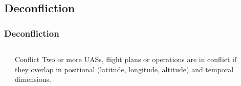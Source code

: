 \documentclass[usenames,dvipsnames,aspectratio=169,serif]{beamer}
\begin{document}
\subsection{Deconfliction}

\begin{frame}
   \frametitle{Deconfliction}
   \begin{columns}[t]
      \begin{column}{0.25\textwidth}
      \end{column}
      \begin{column}{0.5\textwidth}
         \begin{block}{Conflict}
            Two or more UASs, flight plans or operations are in conflict if they overlap in positional (latitude, longitude, altitude) and temporal dimensions.
         \end{block}
      \end{column}
      \begin{column}{0.25\textwidth}
      \end{column}
   \end{columns}
\end{frame}
\end{document}
